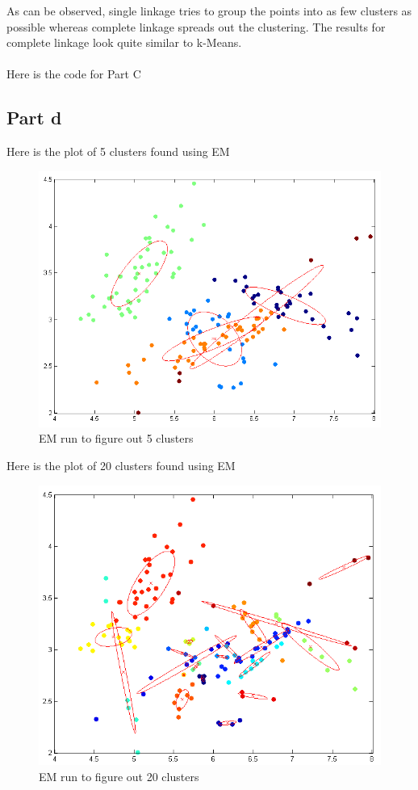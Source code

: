 \documentclass[twoside,11pt]{article}
\theoremstyle{definition}
\begin{document}
\newpage 
As can be observed, single linkage tries to group the points into as few clusters as possible whereas complete linkage spreads out the clustering. The results for complete linkage look quite similar to k-Means. \\
\\
Here is the code for Part C\\


\newpage

\subsection*{Part d}

Here is the plot of 5 clusters found using EM
\begin{figure}[h]
\centering
\includegraphics[width=6 in]{prob1PartD_1.png}
\caption{EM run to figure out 5 clusters}
\end{figure}
\newpage
Here is the plot of 20 clusters found using EM
\begin{figure}[h]
\centering
\includegraphics[width=6 in]{prob1PartD_2.png}
\caption{EM run to figure out 20 clusters}
\end{figure}
\end{document}
